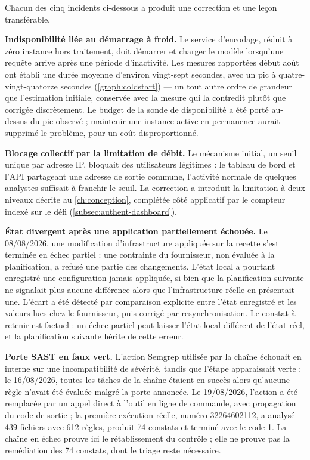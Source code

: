 Chacun des cinq incidents ci-dessous a produit une correction et une leçon transférable.

\textbf{Indisponibilité liée au démarrage à froid.} Le service d'encodage, réduit à zéro instance
hors traitement, doit démarrer et charger le modèle lorsqu'une requête arrive après une période
d'inactivité. Les mesures rapportées début août ont établi une durée moyenne d'environ vingt-sept
secondes, avec un pic à quatre-vingt-quatorze secondes (\cref{graph:coldstart}) --- un tout autre
ordre de grandeur que l'estimation initiale, conservée avec la mesure qui la contredit plutôt que
corrigée discrètement. Le budget de la sonde de disponibilité a été porté au-dessus du pic observé ;
maintenir une instance active en permanence aurait supprimé le problème, pour un coût
disproportionné.

\textbf{Blocage collectif par la limitation de débit.} Le mécanisme initial, un seuil unique par
adresse IP, bloquait des utilisateurs légitimes : le tableau de bord et l'API partageant une
adresse de sortie commune, l'activité normale de quelques analystes suffisait à franchir le seuil.
La correction a introduit la limitation à deux niveaux décrite au \cref{ch:conception}, complétée côté
applicatif par le compteur indexé sur le défi (\cref{subsec:authent-dashboard}).

\textbf{État divergent après une application partiellement échouée.} Le 08/08/2026, une modification
d'infrastructure appliquée sur la recette s'est terminée en échec partiel : une contrainte du
fournisseur, non évaluée à la planification, a refusé une partie des changements. L'état local a
pourtant enregistré une configuration jamais appliquée, si bien que la planification suivante ne
signalait plus aucune différence alors que l'infrastructure réelle en présentait une. L'écart a été
détecté par comparaison explicite entre l'état enregistré et les valeurs lues chez le fournisseur,
puis corrigé par resynchronisation. Le constat à retenir est factuel : un échec partiel peut laisser
l'état local différent de l'état réel, et la planification suivante hérite de cette erreur.

\textbf{Porte SAST en faux vert.} L'action Semgrep utilisée par la chaîne échouait en interne sur
une incompatibilité de sévérité, tandis que l'étape apparaissait verte : le 16/08/2026, toutes les
tâches de la chaîne étaient en succès alors qu'aucune règle n'avait été évaluée malgré la porte
annoncée. Le 19/08/2026, l'action a été remplacée par un appel direct à l'outil en ligne de
commande, avec propagation du code de sortie ; la première exécution réelle, numéro 32264602112, a
analysé 439 fichiers avec 612 règles, produit 74 constats et terminé avec le code 1. La chaîne en
échec prouve ici le rétablissement du contrôle ; elle ne prouve pas la remédiation des 74 constats,
dont le triage reste nécessaire.

